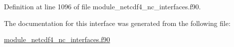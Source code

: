 Definition at line 1096 of file module\+\_\+netcdf4\+\_\+nc\+\_\+interfaces.\+f90.



The documentation for this interface was generated from the following file\+:\begin{DoxyCompactItemize}
\item 
\hyperlink{module__netcdf4__nc__interfaces_8f90}{module\+\_\+netcdf4\+\_\+nc\+\_\+interfaces.\+f90}\end{DoxyCompactItemize}
